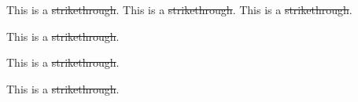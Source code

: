 This is a \sout{strikethrough}.
This is a \sout{strikethrough}.
This is a \sout{strikethrough}.
\begin{frame}[t]
This is a \sout{strikethrough}.
\end{frame}

\begin{frame}[t]
This is a \sout{strikethrough}.
\end{frame}

\begin{frame}[t]
This is a \sout{strikethrough}.
\end{frame}

